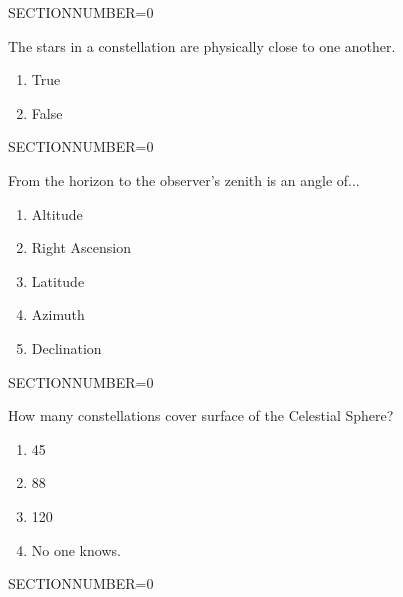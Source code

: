 \documentclass[11pt]{article}
\begin{document}
\begin{enumerate}
\begin{minipage}{\textwidth}
\begin{minipage}{\textwidth}
\end{minipage}
SECTIONNUMBER=0
\end{minipage}
\vskip 0.20in

\begin{minipage}{\textwidth}
\begin{minipage}{\textwidth}
\item The stars in a constellation are physically close to one another.
\begin{multicols}{3}
\begin{enumerate} 
\setlength{\itemsep}{1pt} 
\setlength{\parskip}{0pt} 
\setlength{\parsep}{0pt}
\setlength{\multicolsep}{1pt} 
\item True
\item False
\end{enumerate} 
\vfill 
\end{multicols}

\end{minipage}
SECTIONNUMBER=0
\end{minipage}
\vskip 0.20in

\begin{minipage}{\textwidth}
\begin{minipage}{\textwidth}
\item From the horizon to the observer's zenith is an angle of...
\begin{multicols}{3}
\begin{enumerate} 
\setlength{\itemsep}{1pt} 
\setlength{\parskip}{0pt} 
\setlength{\parsep}{0pt}
\setlength{\multicolsep}{1pt} 
\item Altitude
\item Right Ascension
\item Latitude
\item Azimuth
\item Declination
\end{enumerate} 
\vfill 
\end{multicols}

\end{minipage}
SECTIONNUMBER=0
\end{minipage}
\vskip 0.20in

\begin{minipage}{\textwidth}
\begin{minipage}{\textwidth}
\item How many constellations cover surface of the Celestial Sphere?
\begin{multicols}{3}
\begin{enumerate} 
\setlength{\itemsep}{1pt} 
\setlength{\parskip}{0pt} 
\setlength{\parsep}{0pt}
\setlength{\multicolsep}{1pt} 
\item 45
\item 88
\item 120
\item No one knows.
\end{enumerate} 
\vfill 
\end{multicols}

\end{minipage}
SECTIONNUMBER=0
\end{minipage}
\vskip 0.20in

\end{enumerate}
\end{document}

